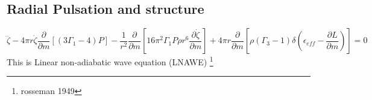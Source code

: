 \subsection{Radial Pulsation and structure}

\begin{equation}
\dddot{\zeta} - 4 \pi r \dot{\zeta} \frac{\partial}{\partial m}[(3\Gamma_1 - 4)P] - \frac{1}{r^2}\frac{\partial}{\partial m}\left[16 \pi^2 \Gamma_1 P \rho r^6 \frac{\partial \dot\zeta}{\partial m}\right] + 4\pi r \frac{\partial}{\partial m} \left[\rho(\Gamma_3 - 1)\delta\left(\epsilon_{eff}-\frac{\partial L}{\partial m}\right)\right] = 0
\end{equation}
This is Linear non-adiabatic wave equation (LNAWE) \footnote{rosseman 1949}

\vspace{4cm}
